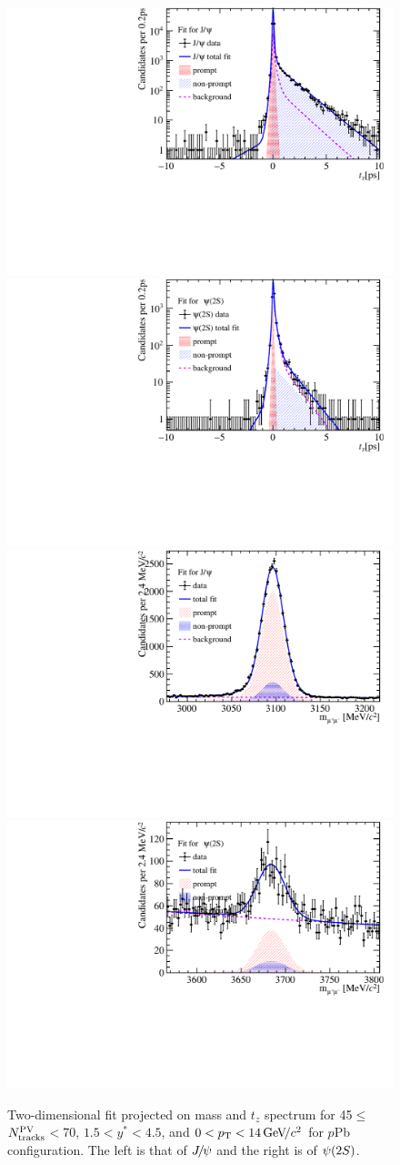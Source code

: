 \begin{figure}[!tbp]
  \begin{center}
    \includegraphics[width=0.49\linewidth]{pdf/pPb/Workdir/TwoDimFit/ProjTz/Jpsi_n2y1pt1.pdf}
    \includegraphics[width=0.49\linewidth]{pdf/pPb/Workdir/TwoDimFit/ProjTz/Psi2S_n2y1pt1.pdf}
    \includegraphics[width=0.49\linewidth]{pdf/pPb/Workdir/TwoDimFit/ProjMass/Jpsi_n2y1pt1.pdf}
    \includegraphics[width=0.49\linewidth]{pdf/pPb/Workdir/TwoDimFit/ProjMass/Psi2S_n2y1pt1.pdf}
  \end{center}
  \caption{
    Two-dimensional fit projected on mass and $t_z$ spectrum for 45$\leq$$N^{\rm PV}_{\rm tracks}$$<$70, $1.5<y^*<4.5$, and $0<p_{\mathrm{T}}<14\text{\,Ge\kern -0.1em V\!/}c^2$ for $p$Pb configuration. The left is that of ${{J\mskip -3mu/\mskip -2mu\psi}}$ and the right is of ${\psi{(2S)}}$.
    }
  \label{fig:2Dtz}
\end{figure}


